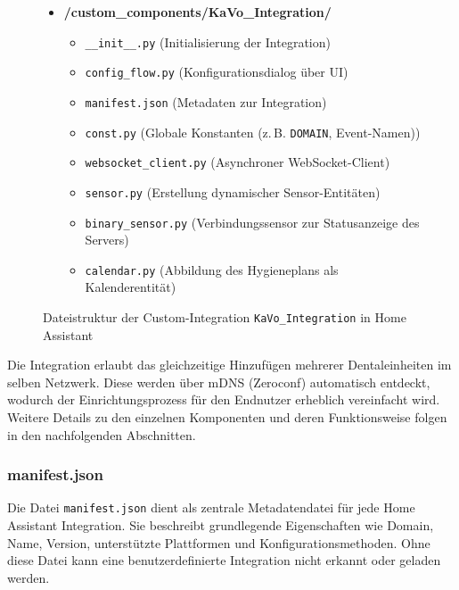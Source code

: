 \begin{figure}[H]
\centering
\begin{minipage}{0.75\textwidth}
\begin{itemize}
  \item \textbf{/custom\_components/KaVo\_Integration/}
  \begin{itemize}
    \item \texttt{\_\_init\_\_.py}     (Initialisierung der Integration)
    \item \texttt{config\_flow.py}     (Konfigurationsdialog über UI)
    \item \texttt{manifest.json}       (Metadaten zur Integration)
    \item \texttt{const.py}            (Globale Konstanten (z.\,B. \texttt{DOMAIN}, Event-Namen))
    \item \texttt{websocket\_client.py}  (Asynchroner WebSocket-Client)
    \item \texttt{sensor.py}             (Erstellung dynamischer Sensor-Entitäten)
    \item \texttt{binary\_sensor.py}     (Verbindungssensor zur Statusanzeige des Servers)
    \item \texttt{calendar.py}           (Abbildung des Hygieneplans als Kalenderentität)
  \end{itemize}
\end{itemize}
\end{minipage}
\caption{Dateistruktur der Custom-Integration \texttt{KaVo\_Integration} in Home Assistant}
\label{fig:kavo-integration-structure}
\end{figure}
\vspace{0.5cm}


Die Integration erlaubt das gleichzeitige Hinzufügen mehrerer Dentaleinheiten im selben Netzwerk. Diese werden über mDNS (Zeroconf) automatisch entdeckt, wodurch der Einrichtungsprozess für den Endnutzer erheblich vereinfacht wird. Weitere Details zu den einzelnen Komponenten und deren Funktionsweise folgen in den nachfolgenden Abschnitten.

\subsubsection{manifest.json}

Die Datei \texttt{manifest.json} dient als zentrale Metadatendatei für jede Home Assistant Integration. Sie beschreibt grundlegende Eigenschaften wie Domain, Name, Version, unterstützte Plattformen und Konfigurationsmethoden. Ohne diese Datei kann eine benutzerdefinierte Integration nicht erkannt oder geladen werden.

